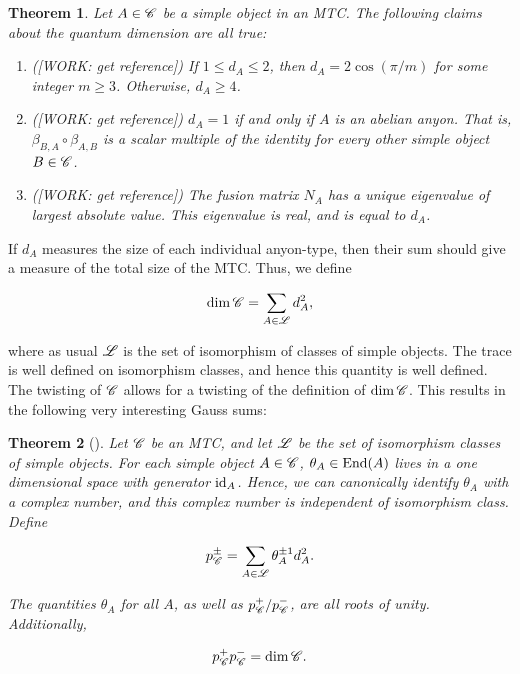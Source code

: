\documentclass{article}
\newtheorem{theorem}{Theorem}[section]
\theoremstyle{definition}
\numberwithin{figure}{section}
\begin{document}
\begin{theorem} Let $A\in \mathscr{C}$ be a simple object in an MTC. The following claims about the quantum dimension are all true:

\begin{enumerate}

\item ([WORK: get reference]) If $1\leq d_A\leq 2$, then $d_A=2\cos(\pi /m)$ for some integer $m\geq 3$. Otherwise, $d_A\geq 4$.

\item ([WORK: get reference]) $d_A=1$ if and only if $A$ is an abelian anyon. That is, $\beta_{B,A}\circ \beta_{A,B}$ is a scalar multiple of the identity for every other simple object $B\in \mathscr{C}$.

\item ([WORK: get reference]) The fusion matrix $N_A$ has a unique eigenvalue of largest absolute value. This eigenvalue is real, and is equal to $d_A$.
\end{enumerate}
\end{theorem}

If $d_A$ measures the size of each individual anyon-type, then their sum should give a measure of the total size of the MTC. Thus, we define

$$\dim \mathscr{C} = \sum_{A\in \mathscr{L}} d_A^2,$$

where as usual $\mathscr{L}$ is the set of isomorphism of classes of simple objects. The trace is well defined on isomorphism classes, and hence this quantity is well defined. The twisting of $\mathscr{C}$ allows for a twisting of the definition of $\dim \mathscr{C}$. This results in the following very interesting Gauss sums:

\begin{theorem}[\cite{vafa1988toward}] Let $\mathscr{C}$ be an MTC, and let $\mathscr{L}$ be the set of isomorphism classes of simple objects. For each simple object $A\in \mathscr{C}$, $\theta_A\in \mathrm{End}(A)$ lives in a one dimensional space with generator $\mathrm{id}_A$. Hence, we can canonically identify $\theta_A$ with a complex number, and this complex number is independent of isomorphism class. Define

$$p^{\pm}_{\mathscr{C}}=\sum_{A\in \mathscr{L}}\theta_A^{\pm 1}d_A^2.$$

The quantities $\theta_A$ for all $A$, as well as $p^{+}_{\mathscr{C}}/p^{-}_{\mathscr{C}}$, are all roots of unity. Additionally,

$$p^{+}_{\mathscr{C}}p^{-}_{\mathscr{C}}=\dim \mathscr{C}.$$
\end{theorem}
\end{document}
